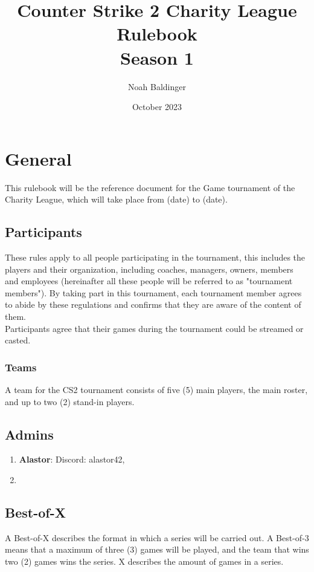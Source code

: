 \documentclass{article}
\title{Counter Strike 2 Charity League Rulebook\\ Season 1}
\author{Noah Baldinger}
\date{October 2023}
\begin{document}
\maketitle

\section{General}

This rulebook will be the reference document for the Game tournament of the Charity League, which will take place from (date) to (date). 

\subsection{Participants}
These rules apply to all people participating in the tournament, this 
includes the players and their organization, including coaches, managers, owners, members and employees (hereinafter all these people 
will be referred to as "tournament members"). By taking part in this tournament, each tournament member agrees to abide by these
regulations and confirms that they are aware of the content of them. \\
Participants agree that their games during the tournament could be streamed or casted.


\subsubsection{Teams}
A team for the CS2 tournament consists of five (5) main players, the main roster, and up to two (2) stand-in players.


\subsection{Admins}

\begin{enumerate}
    \item \textbf{Alastor}: Discord: alastor42,
    \item \textbf{}
\end{enumerate}

\subsection{Best-of-X}
A Best-of-X describes the format in which a series will be carried out. A Best-of-3 means that a maximum of three (3) games will be 
played, and the team that wins two (2) games wins the series. X describes the amount of games in a series.
\end{document}
